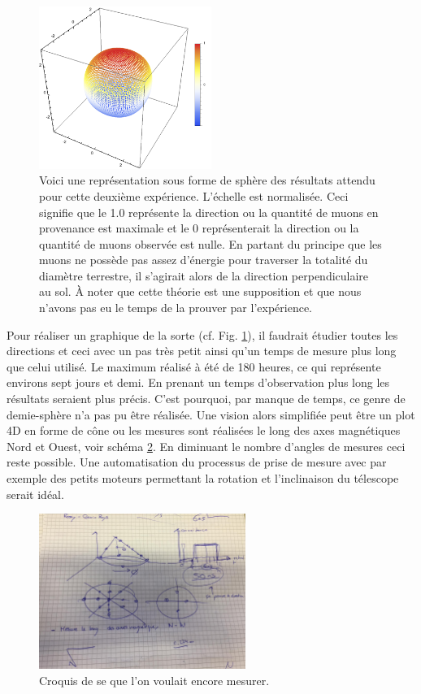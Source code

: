 \documentclass[12pt]{article}
\begin{document}
\begin{figure}
    \centering
    \includegraphics[width=0.5\textwidth]{graphiques/experience2/resultat_telescope_muon.png}
    \caption{Voici une représentation sous forme de sphère des résultats attendu pour cette deuxième expérience. L'échelle est normalisée. Ceci signifie que le 1.0 représente la direction ou la quantité de muons en provenance est maximale et le 0 représenterait la direction ou la quantité de muons observée est nulle. En partant du principe que les muons ne possède pas assez d'énergie pour traverser la totalité du diamètre terrestre, il s'agirait alors de la direction perpendiculaire au sol. À noter que cette théorie est une supposition et que nous n'avons pas eu le temps de la prouver par l'expérience.}
    \label{resultat_telescope_muon}
\end{figure}

Pour réaliser un graphique de la sorte (cf. Fig. \ref{resultat_telescope_muon}), il faudrait étudier toutes les directions et ceci avec un pas très petit ainsi qu'un temps de mesure plus long que celui utilisé. Le maximum réalisé à été de 180 heures, ce qui représente environs sept jours et demi. En prenant un temps d'observation plus long les résultats seraient plus précis. C'est pourquoi, par manque de temps, ce genre de demie-sphère n'a pas pu 
être réalisée. Une vision alors simplifiée peut être un plot 4D en forme de cône ou les mesures sont réalisées le long des axes magnétiques Nord et Ouest, voir schéma \ref{fig:cone}. En diminuant le nombre d'angles de mesures ceci reste possible. Une automatisation du processus de prise de mesure avec par exemple des petits moteurs permettant la rotation et l'inclinaison du télescope serait idéal.

\begin{figure}[htpb!]
    \centering
    \includegraphics[width=0.6\textwidth]{Images/Schemas/Cone.jpeg}
    \caption{Croquis de se que l'on voulait encore mesurer.}
    \label{fig:cone}
\end{figure}
\end{document}
